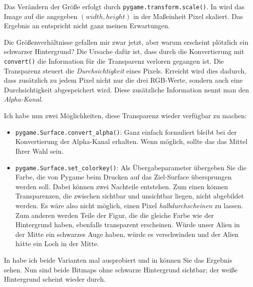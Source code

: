 Das Verändern der Größe erfolgt durch \texttt{pygame\-.trans\-form\-.scale()}. In  wird das Image auf die angegeben $(width, height)$ in der Maßeinheit Pixel skaliert. Das Ergebnis an  entspricht nicht ganz meinen Erwartungen.  

Die Größenverhältnisse gefallen mir zwar jetzt, aber warum erscheint plötzlich ein schwarzer Hintergrund? Die Ursache dafür ist, dass durch die Konvertierung mit \texttt{convert()} die Information für die Transparenz verloren gegangen ist. Die Transparenz steuert die \emph{Durchsichtigkeit} eines Pixels. Erreicht wird dies dadurch, dass zusätzlich zu jedem Pixel nicht nur die drei RGB-Werte, sondern auch eine Durchsichtigkeit abgespeichert wird. Diese zusätzliche Information nennt man den \emph{Alpha-Kanal}.

Ich habe nun zwei Möglichkeiten, diese Transparenz wieder verfügbar zu machen:
\begin{itemize}
	\item \texttt{pygame.Surface.convert\_alpha()}: Ganz einfach formuliert bleibt bei der Konvertierung der Alpha-Kanal erhalten. Wenn möglich, sollte das das Mittel Ihrer Wahl sein.
	
	\item \texttt{pygame.Surface.set\_colorkey()}: Als Übergabeparameter übergeben Sie die Farbe, die von Pygame beim Drucken auf das Ziel-Surface übersprungen werden soll. Dabei können zwei Nachteile entstehen. Zum einen können Transparenzen, die zwischen sichtbar und unsichtbar liegen, nicht abgebildet werden. Es wäre also nicht möglich, einen Pixel \emph{halbdurchscheinen} zu lassen. Zum anderen werden Teile der Figur, die die gleiche Farbe wie der Hintergrund haben, ebenfalls transparent erscheinen. Würde unser Alien in der Mitte ein schwarzes Auge haben, würde es verschwinden und der Alien hätte ein Loch in der Mitte.
\end{itemize}



\begin{figure}
    \vspace{-1.5em}
\end{figure}In  habe ich beide Varianten mal ausprobiert und in  können Sie das Ergebnis sehen. Nun sind beide Bitmaps ohne schwarze Hintergrund sichtbar; der weiße Hintergrund scheint wieder durch.


